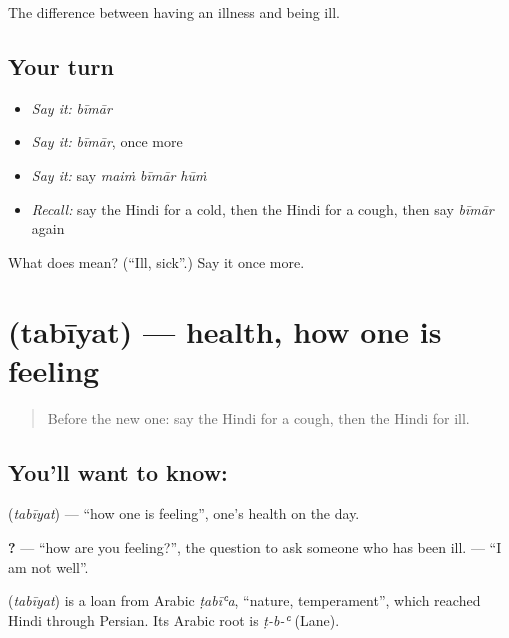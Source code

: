 \begin{grammarlens}[title={What you've built}]
The difference between having an illness and being ill.
\end{grammarlens}

\subsection*{Your turn}
\begin{itemize}
\raggedright
  \item \emph{Say it:} \emph{bīmār}
  \item \emph{Say it:} \emph{bīmār}, once more
  \item \emph{Say it:} say \emph{maiṁ bīmār hūṁ}
  \item \emph{Recall:} say the Hindi for a cold, then the Hindi for a cough, then say \emph{bīmār} again
\end{itemize}

\begin{tcolorbox}[breakable,colback=teal!4,colframe=teal!35!black,title={Before you move on}]
What does  mean? (\textquotedblleft{}Ill, sick\textquotedblright{}.) Say it once more.
\end{tcolorbox}
\section[\texorpdfstring{\hi{तबीयत} (tabīyat)}{तबीयत (tabīyat)}]{ (tabīyat) — health, how one is feeling}

\label{lesson:HI-C106-tabiyat}



\begin{quote}
Before the new one: say the Hindi for a cough, then the Hindi for ill.
\end{quote}

\subsection*{You'll want to know: }
\textbf{} (\emph{tabīyat}) — \textquotedblleft{}how one is feeling\textquotedblright{}, one's health on the day.

\textbf{   ?} — \textquotedblleft{}how are you feeling?\textquotedblright{}, the question to ask someone who has been ill. \textbf{   } — \textquotedblleft{}I am not well\textquotedblright{}.

\begin{cousinweb}
\textbf{} (\emph{tabīyat}) is a loan from Arabic \emph{ṭabīʿa}, \textquotedblleft{}nature, temperament\textquotedblright{}, which reached Hindi through Persian. Its Arabic root is \emph{ṭ-b-ʿ} (Lane).
\end{cousinweb}

